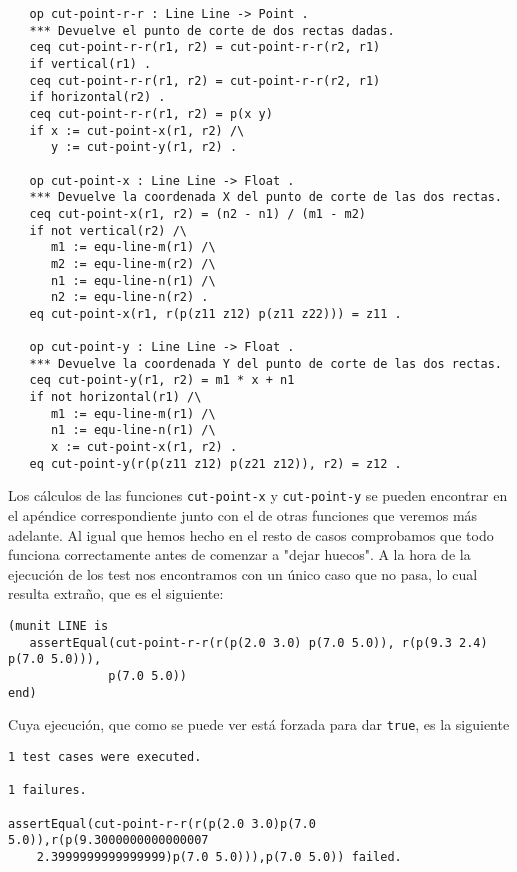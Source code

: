 {\codesize
\begin{verbatim}	
   op cut-point-r-r : Line Line -> Point .
   *** Devuelve el punto de corte de dos rectas dadas.
   ceq cut-point-r-r(r1, r2) = cut-point-r-r(r2, r1)
   if vertical(r1) .
   ceq cut-point-r-r(r1, r2) = cut-point-r-r(r2, r1)
   if horizontal(r2) .
   ceq cut-point-r-r(r1, r2) = p(x y)
   if x := cut-point-x(r1, r2) /\
      y := cut-point-y(r1, r2) .

   op cut-point-x : Line Line -> Float .
   *** Devuelve la coordenada X del punto de corte de las dos rectas.
   ceq cut-point-x(r1, r2) = (n2 - n1) / (m1 - m2)
   if not vertical(r2) /\
      m1 := equ-line-m(r1) /\
      m2 := equ-line-m(r2) /\
      n1 := equ-line-n(r1) /\
      n2 := equ-line-n(r2) .
   eq cut-point-x(r1, r(p(z11 z12) p(z11 z22))) = z11 .
	
   op cut-point-y : Line Line -> Float .
   *** Devuelve la coordenada Y del punto de corte de las dos rectas.
   ceq cut-point-y(r1, r2) = m1 * x + n1
   if not horizontal(r1) /\
      m1 := equ-line-m(r1) /\
      n1 := equ-line-n(r1) /\
      x := cut-point-x(r1, r2) .
   eq cut-point-y(r(p(z11 z12) p(z21 z12)), r2) = z12 .
\end{verbatim}
}

Los cálculos de las funciones \texttt{cut-point-x} y \texttt{cut-point-y} se pueden encontrar en el apéndice correspondiente junto con el de otras funciones que veremos más adelante. Al igual que hemos hecho en el resto de casos comprobamos que todo funciona correctamente antes de comenzar a "dejar huecos". A la hora de la ejecución de los test nos encontramos con un único caso que no pasa, lo cual resulta extraño, que es el siguiente: \par

{\codesize
\begin{verbatim}
(munit LINE is
   assertEqual(cut-point-r-r(r(p(2.0 3.0) p(7.0 5.0)), r(p(9.3 2.4) p(7.0 5.0))),
              p(7.0 5.0))
end)
\end{verbatim}
}

Cuya ejecución, que como se puede ver está forzada para dar \texttt{true}, es la siguiente

{\codesize
\begin{verbatim}
1 test cases were executed.

1 failures.

assertEqual(cut-point-r-r(r(p(2.0 3.0)p(7.0 5.0)),r(p(9.3000000000000007
    2.3999999999999999)p(7.0 5.0))),p(7.0 5.0)) failed.

\end{verbatim}
}

